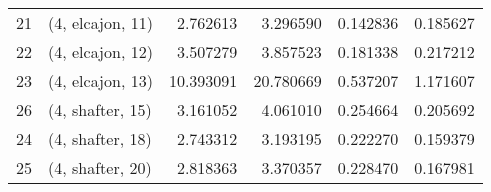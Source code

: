 \begin{tabular}{llrrrr}
21 &  (4, elcajon, 11) &   2.762613 &   3.296590 &   0.142836 &  0.185627 \\
22 &  (4, elcajon, 12) &   3.507279 &   3.857523 &   0.181338 &  0.217212 \\
23 &  (4, elcajon, 13) &  10.393091 &  20.780669 &   0.537207 &  1.171607 \\
26 &  (4, shafter, 15) &   3.161052 &   4.061010 &   0.254664 &  0.205692 \\
24 &  (4, shafter, 18) &   2.743312 &   3.193195 &   0.222270 &  0.159379 \\
25 &  (4, shafter, 20) &   2.818363 &   3.370357 &   0.228470 &  0.167981 \\
\bottomrule
\end{tabular}
